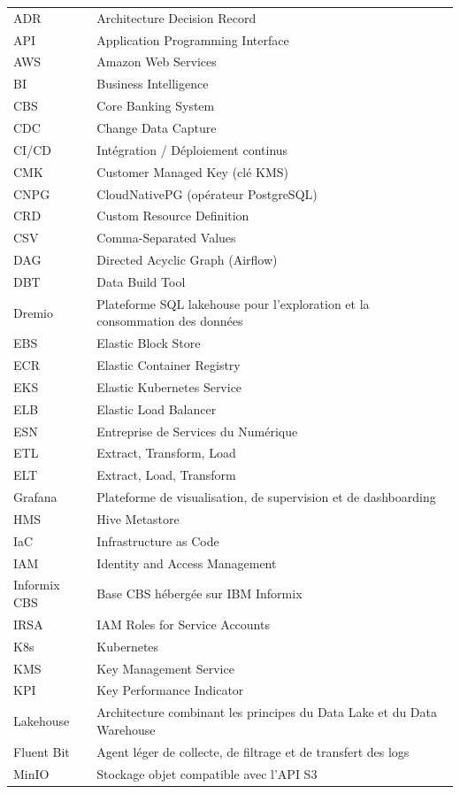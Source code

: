 \begin{longtable}{@{}p{}p{}@{}}
ADR & Architecture Decision Record \\
API & Application Programming Interface \\
AWS & Amazon Web Services \\
BI & Business Intelligence \\
CBS & Core Banking System \\
CDC & Change Data Capture \\
CI/CD & Intégration / Déploiement continus \\
CMK & Customer Managed Key (clé KMS) \\
CNPG & CloudNativePG (opérateur PostgreSQL) \\
CRD & Custom Resource Definition \\
CSV & Comma-Separated Values \\
DAG & Directed Acyclic Graph (Airflow) \\
DBT & Data Build Tool \\
Dremio & Plateforme SQL lakehouse pour l'exploration et la consommation des données \\
EBS & Elastic Block Store \\
ECR & Elastic Container Registry \\
EKS & Elastic Kubernetes Service \\
ELB & Elastic Load Balancer \\
ESN & Entreprise de Services du Numérique \\
ETL & Extract, Transform, Load \\
ELT & Extract, Load, Transform \\
Grafana & Plateforme de visualisation, de supervision et de dashboarding \\
HMS & Hive Metastore \\
IaC & Infrastructure as Code \\
IAM & Identity and Access Management \\
Informix CBS & Base CBS hébergée sur IBM Informix \\
IRSA & IAM Roles for Service Accounts \\
K8s & Kubernetes \\
KMS & Key Management Service \\
KPI & Key Performance Indicator \\
Lakehouse & Architecture combinant les principes du Data Lake et du Data Warehouse \\
Fluent Bit & Agent léger de collecte, de filtrage et de transfert des logs \\
MinIO & Stockage objet compatible avec l'API S3 \\

\end{longtable}

